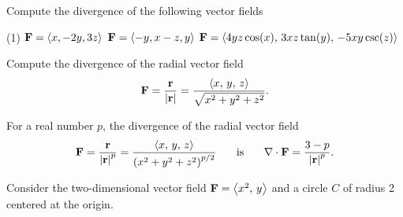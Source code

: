 \documentclass[../mathNotesPreamble]{subfiles}
\begin{document}
  \begin{ex*}
    Compute the divergence of the following vector fields
  \end{ex*}
  \begin{tasks}[after-item-skip=\stretch{1}, label=](1)
    \task $\mathbf F={\left\langle x, -2y, 3z \right\rangle}$
    \task $\mathbf F={\left\langle -y, x-z, y \right\rangle}$
    \task $\mathbf F={\left\langle 4yz\cos(x),\,3xz\tan(y),\,-5xy\csc(z) \right\rangle}$
  \end{tasks}
  \pagebreak

  \begin{ex*}
    Compute the divergence of the radial vector field
      \[\mathbf F=\frac{{\mathbf{r}}}{{\left\vert{\mathbf{r}}\right\vert}}=\frac{{\left\langle x,\,y,\,z \right\rangle}}{\sqrt{x^2+y^2+z^2}}.\]
  \end{ex*}

  \begin{thmBox*}
    For a real number $p$, the divergence of the radial vector field
      \[\mathbf F=\frac{{\mathbf{r}}}{{\left\vert{\mathbf{r}}\right\vert}^p}=\frac{{\left\langle x,\,y,\,z \right\rangle}}{{\left(x^2+y^2+z^2\right)}^{p/2}} \hspace*{15pt}\textnormal{ is }\hspace*{15pt} \nabla\cdot\mathbf F= \frac{3-p}{{\left\vert{\mathbf{r}}\right\vert}^p}.\]
  \end{thmBox*}
  \pagebreak

  \begin{ex*}
    Consider the two-dimensional vector field $\mathbf F={\left\langle x^2,\,y \right\rangle}$ and a circle $C$ of radius 2 centered at the origin. 
  \end{ex*}
\end{document}

